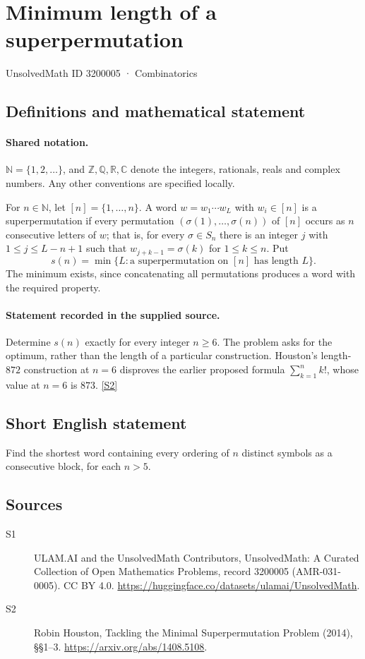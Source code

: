 \documentclass[11pt]{article}
\newcommand{\sref}[2]{\hyperlink{source:#1:#2}{[S#2]}}
\begin{document}
\setcounter{section}{3200004}
\section{Minimum length of a superpermutation}\label{3200005}
{\small\sffamily UnsolvedMath ID 3200005 · Combinatorics}
\subsection{Definitions and mathematical statement}

\paragraph{Shared notation.}$\mathbb N=\{1,2,\ldots\}$, and $\mathbb Z,\mathbb Q,\mathbb R,\mathbb C$ denote the integers, rationals, reals and complex numbers. Any other conventions are specified locally.


For $n\in\mathbb N$, let $[n]=\{1,\ldots,n\}$. A word $w=w_1\cdots w_L$ with $w_i\in[n]$ is a superpermutation if every permutation $(\sigma(1),\ldots,\sigma(n))$ of $[n]$ occurs as $n$ consecutive letters of $w$; that is, for every $\sigma\in S_n$ there is an integer $j$ with $1\le j\le L-n+1$ such that $w_{j+k-1}=\sigma(k)$ for $1\le k\le n$. Put
\[
s(n)=\min\{L:\text{a superpermutation on }[n]\text{ has length }L\}.
\]
The minimum exists, since concatenating all permutations produces a word with the required property.
\paragraph{Statement recorded in the supplied source.}
Determine $s(n)$ exactly for every integer $n\ge6$. The problem asks for the optimum, rather than the length of a particular construction. Houston's length-$872$ construction at $n=6$ disproves the earlier proposed formula $\sum_{k=1}^{n}k!$, whose value at $n=6$ is $873$. \sref{3200005}{2}
\subsection{Short English statement}
Find the shortest word containing every ordering of $n$ distinct symbols as a consecutive block, for each $n>5$.
\subsection{Sources}
\begin{description}
\item[\hypertarget{source:3200005:1}{S1}] ULAM.AI and the UnsolvedMath Contributors, UnsolvedMath: A Curated Collection of Open Mathematics Problems, record 3200005 (AMR-031-0005). CC BY 4.0. \url{https://huggingface.co/datasets/ulamai/UnsolvedMath}.
\item[\hypertarget{source:3200005:2}{S2}] Robin Houston, Tackling the Minimal Superpermutation Problem (2014), §§1–3. \url{https://arxiv.org/abs/1408.5108}.
\end{description}
\label{end:3200005}
\end{document}
